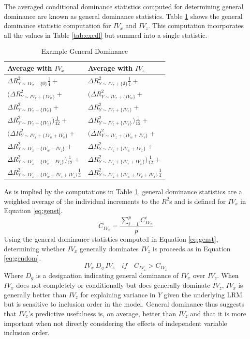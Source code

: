 \documentclass[man]{apa7}
\begin{document}
	The averaged conditional dominance statistics computed for determining general dominance are known as general dominance statistics. 
	Table \ref{tab:exgen} shows the general dominance statistic computation for $IV_x$ and $IV_z$.
	This computation incorporates all the values in Table \ref{tab:excdl} but summed into a single statistic.
	
		\begin{table}[h!]
		\centering
		\caption{\centering Example General Dominance}
		\begin{tabular}{ l l }
			Average with $IV_x$ & Average with $IV_z$ \\
			\hline
			$\Delta R^2_{Y \sim IV_x + \{\emptyset\}}\frac{1}{4} + $ & $\Delta R^2_{Y \sim IV_z + \{\emptyset\}}\frac{1}{4} +$ \\
			$(\Delta R^2_{Y \sim IV_x + \{IV_w\}} + $ & $(\Delta R^2_{Y \sim IV_z + \{IV_w\}} + $ \\
			$\Delta R^2_{Y \sim IV_x + \{IV_v\}} + $ & $\Delta R^2_{Y \sim IV_z + \{IV_v\}} + $ \\
			$\Delta R^2_{Y \sim IV_x + \{IV_z\}})\frac{1}{12} + $ & $\Delta R^2_{Y \sim IV_z + \{IV_x\}})\frac{1}{12} + $ \\
			$(\Delta R^2_{Y \sim IV_x + \{IV_w + IV_v\}} + $ & $(\Delta R^2_{Y \sim IV_z + \{IV_w + IV_v\}} + $ \\
			$\Delta R^2_{Y \sim IV_x + \{IV_w + IV_z\}} + $ & $\Delta R^2_{Y \sim IV_z + \{IV_w + IV_x\}} + $ \\
			$\Delta R^2_{Y \sim IV_x - \{IV_v + IV_z\}})\frac{1}{12} + $ & $\Delta R^2_{Y \sim IV_z + \{IV_v + IV_x\}})\frac{1}{12} +$ \\
			$\Delta R^2_{Y \sim IV_x + \{IV_w + IV_v + IV_z\}}\frac{1}{4}$ & $\Delta R^2_{Y \sim IV_z + \{IV_w + IV_v + IV_x\}}\frac{1}{4}$ \\
			\hline
		\end{tabular}
		\label{tab:exgen}
	\end{table}

	As is implied by the computations in Table \ref{tab:exgen}, general dominance statistics are a weighted average of the individual increments to the $R^2$s and is defined for $IV_x$ in Equation \ref{eq:genst}.
	\begin{equation}
		C_{IV_x} = \frac{\sum^{p}_{i=1} C^i_{IV_x}}{p}
		\label{eq:genst}
	\end{equation}
	Using the general dominance statistics computed in Equation \ref{eq:genst}, determining whether $IV_x$ generally dominates $IV_z$ is proceeds as in Equation \ref{eq:gendom}.
	\begin{equation}
		IV_x \ D_g \ IV_z \quad if \quad C_{IV_x} > C_{IV_z}
		\label{eq:gendom}
	\end{equation}
	Where $D_g$ is a designation indicating general dominance of $IV_x$ over $IV_z$.	
	When $IV_x$ does not completely or conditionally but does generally dominate $IV_z$, $IV_x$ is generally better than $IV_z$ for explaining variance in $Y$ given the underlying LRM but is sensitive to inclusion order in the model.
	General dominance thus suggests that $IV_x$'s predictive usefulness is, on average, better than $IV_z$ and that it is more important when not directly considering the effects of independent variable inclusion order.
	
\end{document}
